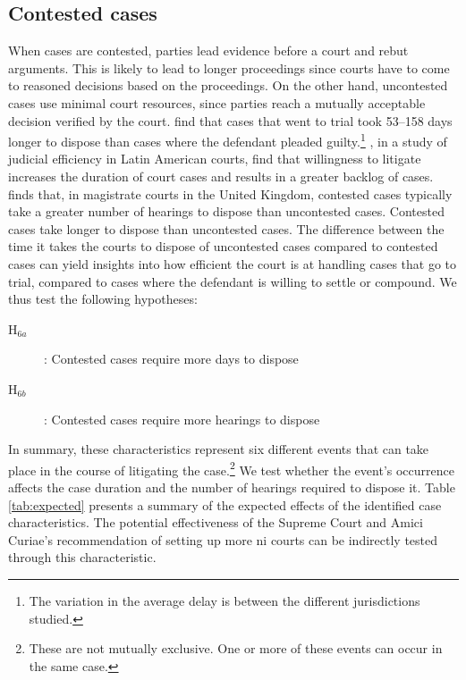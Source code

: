 \subsection{Contested cases}
\label{sec:contested_cases_meth}
When cases are contested, parties lead evidence before a court and rebut arguments. This is likely to lead to longer proceedings since courts have to come to reasoned decisions based on the proceedings. On the other hand, uncontested cases use minimal court resources, since parties reach a mutually acceptable decision verified by the court. \textcite{ostrom2000efficiency} find that cases that went to trial took 53--158 days longer to dispose than cases where the defendant pleaded guilty.\footnote{The variation in the average delay is between the different jurisdictions studied.} \textcite{buscaglia1997_latinAmericaCourtDelays}, in a study of judicial efficiency in Latin American courts, find that willingness to litigate increases the duration of court cases and results in a greater backlog of cases. \textcite{crownProsecutionService2006_magistrateCourtEfficiency} finds that, in magistrate courts in the United Kingdom, contested cases typically take a greater number of hearings to dispose than uncontested cases. Contested cases take longer to dispose than uncontested cases. The difference between the time it takes the courts to dispose of uncontested cases compared to contested cases can yield insights into how efficient the court is at handling cases that go to trial, compared to cases where the defendant is willing to settle or compound. We thus test the following hypotheses:

\begin{description}
\item[H$_{6a}$]: Contested cases require more days to dispose
\item[H$_{6b}$]: Contested cases require more hearings to dispose
\end{description}

In summary, these characteristics represent six different events that can take place in the course of litigating the case.\footnote{These are not mutually exclusive. One or more of these events can occur in the same case.} We test whether the event's occurrence affects the case duration and the number of hearings required to dispose it. Table \ref{tab:expected} presents a summary of the expected effects of the identified case characteristics. The potential effectiveness of the Supreme Court and Amici Curiae's recommendation of setting up more \gls{ni} courts can be indirectly tested through this characteristic. 

